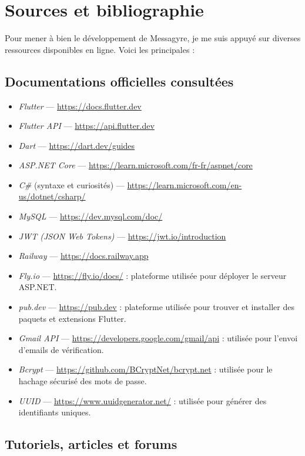 \documentclass[12pt]{report}
\begin{document}
	\chapter{Sources et bibliographie}

Pour mener à bien le développement de Messagyre, je me suis appuyé sur diverses ressources disponibles en ligne. Voici les principales :

\printbibliography[heading=none]

\section{Documentations officielles consultées}

\begin{itemize}
	\item \textit{Flutter} — \url{https://docs.flutter.dev}
	\item \textit{Flutter API} — \url{https://api.flutter.dev}
	\item \textit{Dart} — \url{https://dart.dev/guides}
	\item \textit{ASP.NET Core} — \url{https://learn.microsoft.com/fr-fr/aspnet/core}
	\item \textit{C\#} (syntaxe et curiosités) — \url{https://learn.microsoft.com/en-us/dotnet/csharp/}
	\item \textit{MySQL} — \url{https://dev.mysql.com/doc/}
	\item \textit{JWT (JSON Web Tokens)} — \url{https://jwt.io/introduction}
	\item \textit{Railway} — \url{https://docs.railway.app}
	\item \textit{Fly.io} — \url{https://fly.io/docs/} : plateforme utilisée pour déployer le serveur ASP.NET.
	\item \textit{pub.dev} — \url{https://pub.dev} : plateforme utilisée pour trouver et installer des paquets et extensions Flutter.
	\item \textit{Gmail API} — \url{https://developers.google.com/gmail/api} : utilisée pour l’envoi d’emails de vérification.
	\item \textit{Bcrypt} — \url{https://github.com/BCryptNet/bcrypt.net} : utilisée pour le hachage sécurisé des mots de passe.
	\item \textit{UUID} — \url{https://www.uuidgenerator.net/} : utilisée pour générer des identifiants uniques.
\end{itemize}

\section{Tutoriels, articles et forums}
\end{document}
